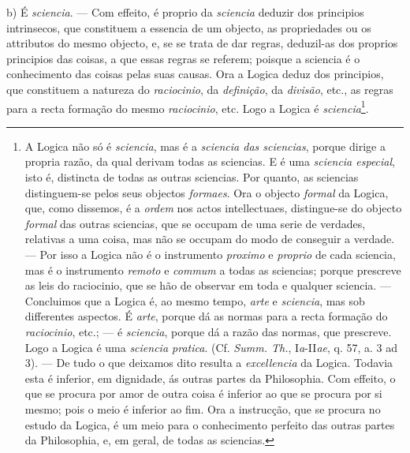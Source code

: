 b) É \emph{sciencia}. --- Com effeito, é proprio da \emph{sciencia} deduzir dos principios intrinsecos, que constituem a essencia de um objecto, as propriedades ou os attributos do mesmo objecto, e, se se trata de dar regras, deduzil-as dos proprios principios das coisas, a que essas regras se referem; poisque a sciencia é o conhecimento das coisas pelas suas causas. Ora a Logica deduz dos principios, que constituem a natureza do \emph{raciocinio}, da \emph{definição}, da \emph{divisão}, etc., as regras para a recta formação do mesmo \emph{raciocinio}, etc. Logo a Logica é \emph{sciencia}\footnote{A Logica não só é \emph{sciencia}, mas é a \emph{sciencia das sciencias}, porque dirige a propria razão, da qual derivam todas as sciencias. E é uma \emph{sciencia especial}, isto é, distincta de todas as outras sciencias. Por quanto, as sciencias distinguem-se pelos seus objectos \emph{formaes}. Ora o objecto \emph{formal} da Logica, que, como dissemos, é a \emph{ordem} nos actos intellectuaes, distingue-se do objecto \emph{formal} das outras sciencias, que se occupam de uma serie de verdades, relativas a uma coisa, mas não se occupam do modo de conseguir a verdade. --- Por isso a Logica não é o instrumento \emph{proximo} e \emph{proprio} de cada sciencia, mas é o instrumento \emph{remoto} e \emph{commum} a todas as sciencias; porque prescreve as leis do raciocinio, que se hão de observar em toda e qualquer sciencia. --- Concluimos que a Logica é, ao mesmo tempo, \emph{arte} e \emph{sciencia}, mas sob differentes aspectos. É \emph{arte}, porque dá as normas para a recta formação do \emph{raciocinio}, etc.; --- é \emph{sciencia}, porque dá a razão das normas, que prescreve. Logo a Logica é uma \emph{sciencia pratica}. (Cf. \emph{Summ. Th.}, I\emph{a}-II\emph{ae}, q. 57, a. 3 ad 3). --- De tudo o que deixamos dito resulta a \emph{excellencia} da Logica. Todavia esta é inferior, em dignidade, ás outras partes da Philosophia. Com effeito, o que se procura por amor de outra coisa é inferior ao que se procura por si mesmo; pois o meio é inferior ao fim. Ora a instrucção, que se procura no estudo da Logica, é um meio para o conhecimento perfeito das outras partes da Philosophia, e, em geral, de todas as sciencias.}.


